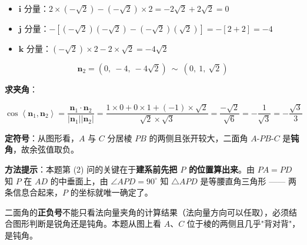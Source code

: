 \begin{answer}
\begin{itemize}
\item $\boldsymbol i$ 分量：$2\times(-\sqrt2)-(-\sqrt2)\times2=-2\sqrt2+2\sqrt2=0$
\item $\boldsymbol j$ 分量：$-\left[(-\sqrt2)(-\sqrt2)-(-\sqrt2)(\sqrt2)\right]=-[2+2]=-4$
\item $\boldsymbol k$ 分量：$(-\sqrt2)\times2-2\times\sqrt2=-4\sqrt2$
\end{itemize}

\nopagebreak[4]
\[\boldsymbol n_2=\left(0,\ -4,\ -4\sqrt2\right)\ \sim\ \left(0,\ 1,\ \sqrt2\right)\]

\textbf{求夹角}：

\nopagebreak[4]
\[\cos\left\langle\boldsymbol n_1,\boldsymbol n_2\right\rangle=\frac{\boldsymbol n_1\cdot\boldsymbol n_2}{\left|\boldsymbol n_1\right|\left|\boldsymbol n_2\right|}=\frac{1\times0+0\times1+(-1)\times\sqrt2}{\sqrt2\times\sqrt3}=\frac{-\sqrt2}{\sqrt6}=-\frac1{\sqrt3}=-\frac{\sqrt3}3\]

\textbf{定符号}：从图形看，$A$ 与 $C$ 分居棱 $PB$ 的两侧且张开较大，二面角 $A\text{-}PB\text{-}C$ 是\textbf{钝角}，故余弦值取负。

\begin{gktip}
\textbf{方法提示}：本题第 (2) 问的关键在于\textbf{建系前先把 $P$ 的位置算出来}。由 $PA=PD$ 知 $P$ 在 $AD$ 的中垂面上，由 $\angle APD=90^\circ$ 知 $\triangle APD$ 是等腰直角三角形 —— 两条信息合起来，$P$ 的坐标就唯一确定了。

二面角的\textbf{正负号}不能只看法向量夹角的计算结果（法向量方向可以任取），必须结合图形判断是锐角还是钝角。本题从图上看 $A$、$C$ 位于棱的两侧且几乎"背对背"，是钝角。
\end{gktip}



\par\medskip

\end{answer}
